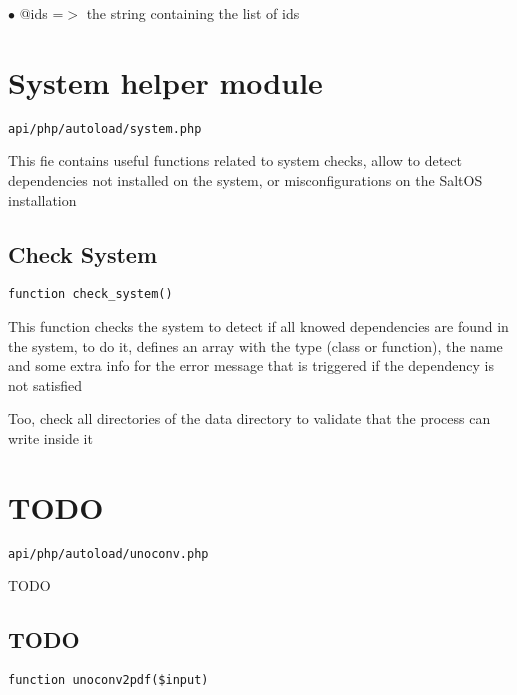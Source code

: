 \documentclass[a4paper]{book}
\begin{document}
\begin{compactitem}
\item[\color{myblue}$\bullet$] @ids =$>$ the string containing the list of ids
\end{compactitem}

\hypertarget{toc284}{}
\section{System helper module}

\begin{lstlisting}
api/php/autoload/system.php
\end{lstlisting}

This fie contains useful functions related to system checks, allow to detect dependencies not
installed on the system, or misconfigurations on the SaltOS installation

\hypertarget{toc285}{}
\subsection{Check System}

\begin{lstlisting}
function check_system()
\end{lstlisting}

This function checks the system to detect if all knowed dependencies are found in the system, to do it,
defines an array with the type (class or function), the name and some extra info for the error message
that is triggered if the dependency is not satisfied

Too, check all directories of the data directory to validate that the process can write inside it

\hypertarget{toc286}{}
\section{TODO}

\begin{lstlisting}
api/php/autoload/unoconv.php
\end{lstlisting}

TODO

\hypertarget{toc287}{}
\subsection{TODO}

\begin{lstlisting}
function unoconv2pdf($input)
\end{lstlisting}
\end{document}
